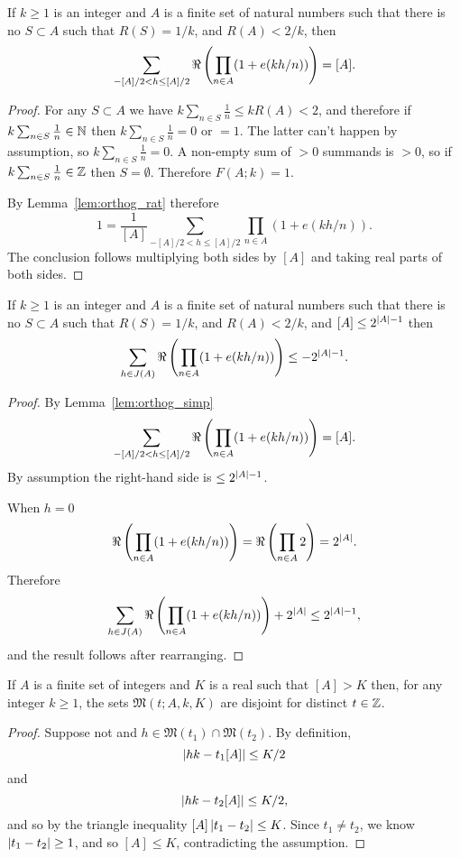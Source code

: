 \begin{lemma}\label{lem:orthog_simp}
If $k\geq 1$ is an integer and $A$ is a finite set of natural numbers such that there is no $S\subset A$ such that $R(S)=1/k$, and $R(A)<2/k$, then
\[\sum_{-[A]/2< h\leq [A]/2}\Re\left( \prod_{n\in A}(1+e(kh/n))\right)= [A].\]
\end{lemma}
\begin{proof}
For any $S\subset A$ we have $k\sum_{n\in S}\frac{1}{n}\leq kR(A)<2$, and therefore if $k\sum_{n\in S}\frac{1}{n} \in \mathbb{N}$ then $k\sum_{n\in S}\frac{1}{n} =0$ or $=1$. The latter can't happen by assumption, so $k\sum_{n\in S}\frac{1}{n} =0$. A non-empty sum of $>0$ summands is $>0$, so if $k\sum_{n\in S}\frac{1}{n}\in \mathbb{Z}$ then $S=\emptyset$. Therefore $F(A;k)=1$.

By Lemma~\ref{lem:orthog_rat} therefore
\[1=\frac{1}{[A]}\sum_{-[A]/2< h\leq [A]/2}\prod_{n\in A}(1+e(kh/n)).\]
The conclusion follows multiplying both sides by $[A]$ and taking real parts of both sides.
\end{proof}

\begin{lemma}\label{lem:orthog_simp2}
If $k\geq 1$ is an integer and $A$ is a finite set of natural numbers such that there is no $S\subset A$ such that $R(S)=1/k$, and $R(A)<2/k$, and $[A]\leq 2^{\left\lvert A\right\rvert-1}$ then
\[\sum_{h\in J(A)}\Re\left( \prod_{n\in A}(1+e(kh/n))\right)\leq -2^{\left\lvert A\right\rvert-1}.\]
\end{lemma}
\begin{proof}
By Lemma~\ref{lem:orthog_simp}
\[\sum_{-[A]/2< h\leq [A]/2}\Re\left( \prod_{n\in A}(1+e(kh/n))\right)= [A].\]
By assumption the right-hand side is $\leq 2^{\left\lvert A\right\rvert-1}$.

When $h=0$
\[\Re\left( \prod_{n\in A}(1+e(kh/n))\right)= \Re\left( \prod_{n\in A}2\right)=2^{\left\lvert A\right\rvert}.\]
Therefore
\[\sum_{h\in J(A)}\Re\left( \prod_{n\in A}(1+e(kh/n))\right)+2^{\left\lvert A\right\rvert}\leq 2^{\left\lvert A\right\rvert-1},\]
and the result follows after rearranging.
\end{proof}

\begin{lemma}\label{lem:majorarcs_disjoint}
If $A$ is a finite set of integers and $K$ is a real such that $[A]>K$ then, for any integer $k\geq 1$, the sets $\mathfrak{M}(t;A,k,K)$ are disjoint for distinct $t\in \mathbb{Z}$.
\end{lemma}
\begin{proof}
Suppose not and $h\in \mathfrak{M}(t_1)\cap \mathfrak{M}(t_2)$. By definition,
\[\left\lvert hk-t_1[A]\right\rvert\leq K/2\]
and
\[\left\lvert hk-t_2[A]\right\rvert\leq K/2,\]
and so by the triangle inequality $[A]\left\lvert t_1-t_2\right\rvert\leq K$. Since $t_1\neq t_2$, we know $\left\lvert t_1-t_2\right\rvert\geq 1$, and so $[A]\leq K$, contradicting the assumption.
\end{proof}

